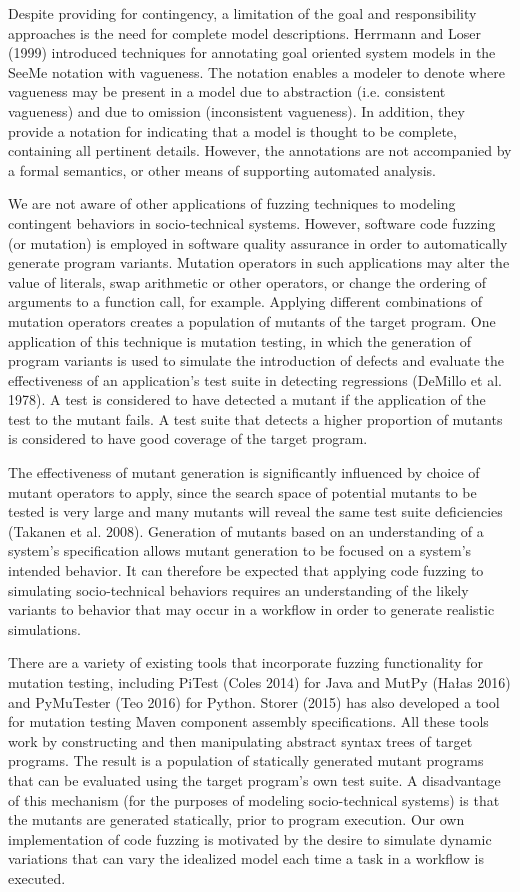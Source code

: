 \documentclass{llncs}
\begin{document}
Despite providing for contingency, a limitation of the goal and responsibility approaches is the need for complete model
descriptions. Herrmann and Loser (1999) introduced techniques for annotating goal oriented system models in the SeeMe
notation with vagueness.  The notation enables a modeler to denote where vagueness may be present in a model due to
abstraction (i.e. consistent vagueness) and due to omission (inconsistent vagueness).  In addition, they provide a
notation for indicating that a model is thought to be complete, containing all pertinent details.  However, the
annotations are not accompanied by a formal semantics, or other means of supporting automated analysis.

We are not aware of other applications of fuzzing techniques to modeling contingent behaviors in socio-technical
systems.  However, software code fuzzing (or mutation) is employed in software quality assurance in order to
automatically generate program variants.  Mutation operators in such applications may alter the value of literals, swap
arithmetic or other operators, or change the ordering of arguments to a function call, for example.  Applying different
combinations of mutation operators creates a population of mutants of the target program.  One application of this
technique is mutation testing, in which the generation of program variants is used to simulate the introduction of
defects and evaluate the effectiveness of an application's test suite in detecting regressions (DeMillo et al. 1978).  A
test is considered to have detected a mutant if the application of the test to the mutant fails.  A test suite that
detects a higher proportion of mutants is considered to have good coverage of the target program.

The effectiveness of mutant generation is significantly influenced by choice of mutant operators to apply, since the
search space of potential mutants to be tested is very large and many mutants will reveal the same test suite
deficiencies (Takanen et al. 2008).  Generation of mutants based on an understanding of a system's specification allows
mutant generation to be focused on a system's intended behavior.  It can therefore be expected that applying code
fuzzing to simulating socio-technical behaviors requires an understanding of the likely variants to behavior that may
occur in a workflow in order to generate realistic simulations.

There are a variety of existing tools that incorporate fuzzing functionality for mutation testing, including PiTest
(Coles 2014) for Java and MutPy (Hałas 2016) and PyMuTester (Teo 2016) for Python.  Storer (2015) has also developed a
tool for mutation testing Maven component assembly specifications. All these tools work by constructing and then
manipulating abstract syntax trees of target programs.  The result is a population of statically generated mutant
programs that can be evaluated using the target program's own test suite.  A disadvantage of this mechanism (for the
purposes of modeling socio-technical systems) is that the mutants are generated statically, prior to program execution.
Our own implementation of code fuzzing is motivated by the desire to simulate dynamic variations that can vary the
idealized model each time a task in a workflow is executed.
\end{document}
